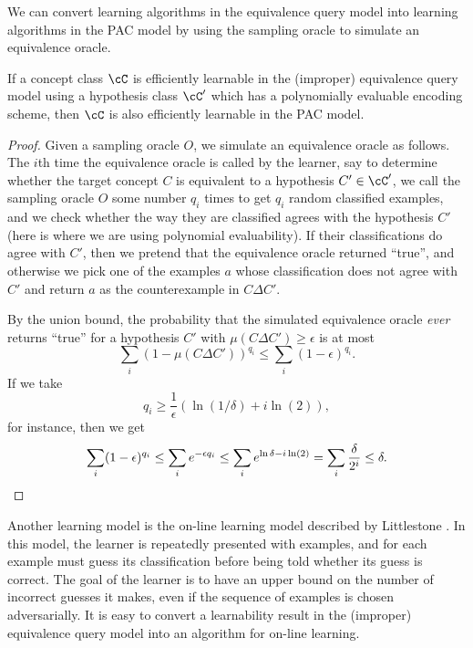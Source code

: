 We can convert learning algorithms in the equivalence query model into learning algorithms in the PAC model by using the sampling oracle to simulate an equivalence oracle.

\begin{prop} If a concept class $\cC$ is efficiently learnable in the (improper) equivalence query model using a hypothesis class $\cC'$ which has a polynomially evaluable encoding scheme, then $\cC$ is also efficiently learnable in the PAC model.
\end{prop}
\begin{proof} Given a sampling oracle $O$, we simulate an equivalence oracle as follows. The $i$th time the equivalence oracle is called by the learner, say to determine whether the target concept $C$ is equivalent to a hypothesis $C' \in \cC'$, we call the sampling oracle $O$ some number $q_i$ times to get $q_i$ random classified examples, and we check whether the way they are classified agrees with the hypothesis $C'$ (here is where we are using polynomial evaluability). If their classifications do agree with $C'$, then we pretend that the equivalence oracle returned ``true'', and otherwise we pick one of the examples $a$ whose classification does not agree with $C'$ and return $a$ as the counterexample in $C \Delta C'$.

By the union bound, the probability that the simulated equivalence oracle \emph{ever} returns ``true'' for a hypothesis $C'$ with $\mu(C\Delta C') \ge \epsilon$ is at most
\[
\sum_i (1-\mu(C\Delta C'))^{q_i} \le \sum_i (1-\epsilon)^{q_i}.
\]
If we take
\[
q_i \ge \frac{1}{\epsilon}(\ln(1/\delta) + i\ln(2)),
\]
for instance, then we get
\[
\sum_i (1-\epsilon)^{q_i} \le \sum_i e^{-\epsilon q_i} \le \sum_i e^{\ln \delta - i\ln(2)} = \sum_i \frac{\delta}{2^i} \le \delta.\qedhere
\]
\end{proof}

\begin{rem} Another learning model is the on-line learning model described by Littlestone \cite{littlestone-online-learning}. In this model, the learner is repeatedly presented with examples, and for each example must guess its classification before being told whether its guess is correct. The goal of the learner is to have an upper bound on the number of incorrect guesses it makes, even if the sequence of examples is chosen adversarially. It is easy to convert a learnability result in the (improper) equivalence query model into an algorithm for on-line learning.
\end{rem}

